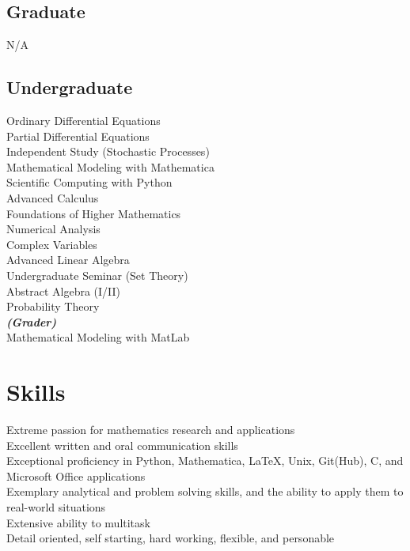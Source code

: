 \documentclass[letterpaper]{deedy-resume} %
\begin{document}
\begin{minipage}[t]{0.33\textwidth}
\subsection{Graduate}
N/A

\sectionspace %


\subsection{Undergraduate}

Ordinary Differential Equations \\
Partial Differential Equations \\
Independent Study (Stochastic Processes) \\
Mathematical Modeling with Mathematica \\
Scientific Computing with Python \\
Advanced Calculus \\
Foundations of Higher Mathematics \\
Numerical Analysis \\
Complex Variables \\
Advanced Linear Algebra \\
Undergraduate Seminar (Set Theory) \\
Abstract Algebra (I/II)\\
Probability Theory \\
{\footnotesize \textit{\textbf{(Grader) }}} \\
Mathematical Modeling with MatLab

\sectionspace %


\section{Skills}
\textbullet{} Extreme passion for mathematics research and applications\\
\textbullet{} Excellent written and oral communication skills\\
\textbullet{} Exceptional proficiency in Python, Mathematica, \LaTeX, Unix, Git(Hub), C, and Microsoft Office applications\\
\textbullet{} Exemplary analytical and problem solving skills, and the ability to apply them to real-world situations\\
\textbullet{} Extensive ability to multitask\\
\textbullet{} Detail oriented, self starting, hard working, flexible, and personable



\end{minipage} %
\end{document}
